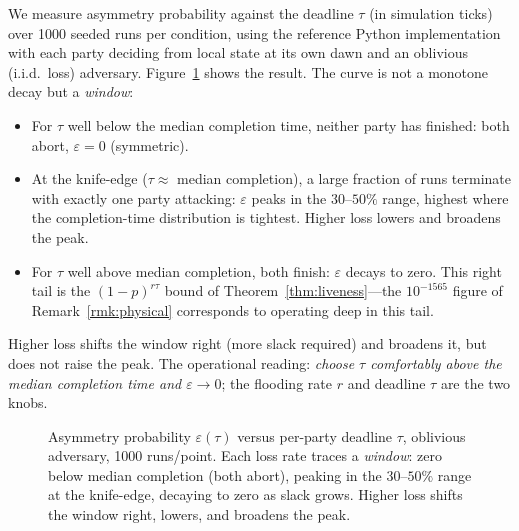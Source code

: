 We measure asymmetry probability against the deadline $\tau$ (in simulation ticks) over 1000 seeded runs per condition, using the reference Python implementation with each party deciding from local state at its own dawn and an oblivious (i.i.d.\ loss) adversary. Figure~\ref{fig:eps-tau} shows the result. The curve is not a monotone decay but a \emph{window}:
\begin{itemize}
    \item For $\tau$ well below the median completion time, neither party has finished: both abort, $\varepsilon = 0$ (symmetric).
    \item At the knife-edge ($\tau \approx$ median completion), a large fraction of runs terminate with exactly one party attacking: $\varepsilon$ peaks in the $30$--$50\%$ range, highest where the completion-time distribution is tightest. Higher loss lowers and broadens the peak.
    \item For $\tau$ well above median completion, both finish: $\varepsilon$ decays to zero. This right tail is the $(1-p)^{r\tau}$ bound of Theorem~\ref{thm:liveness}---the $10^{-1565}$ figure of Remark~\ref{rmk:physical} corresponds to operating deep in this tail.
\end{itemize}
Higher loss shifts the window right (more slack required) and broadens it, but does not raise the peak. The operational reading: \emph{choose $\tau$ comfortably above the median completion time and $\varepsilon \to 0$}; the flooding rate $r$ and deadline $\tau$ are the two knobs.

\begin{figure}[t]
\centering
{}
\caption{Asymmetry probability $\varepsilon(\tau)$ versus per-party deadline $\tau$, oblivious adversary, 1000 runs/point. Each loss rate traces a \emph{window}: zero below median completion (both abort), peaking in the $30$--$50\%$ range at the knife-edge, decaying to zero as slack grows. Higher loss shifts the window right, lowers, and broadens the peak.}
\label{fig:eps-tau}
\end{figure}

